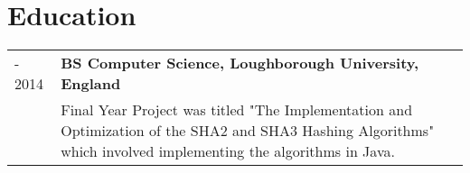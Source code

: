 \documentclass[11pt, letterpaper]{article}
\begin{document}
\section*{\selectfont Education}
\vspace{-0.5cm}
\begin{longtable}{p{1in}|p{6in}}
	\centering 2011 - 2014 & \textbf{BS Computer Science, Loughborough University, England}\vspace{0.1cm}\\&
	\small{Final Year Project was titled "The Implementation and Optimization of the SHA2 and SHA3 Hashing Algorithms" which involved implementing the algorithms in Java.}\\
\end{longtable}
\end{document}
